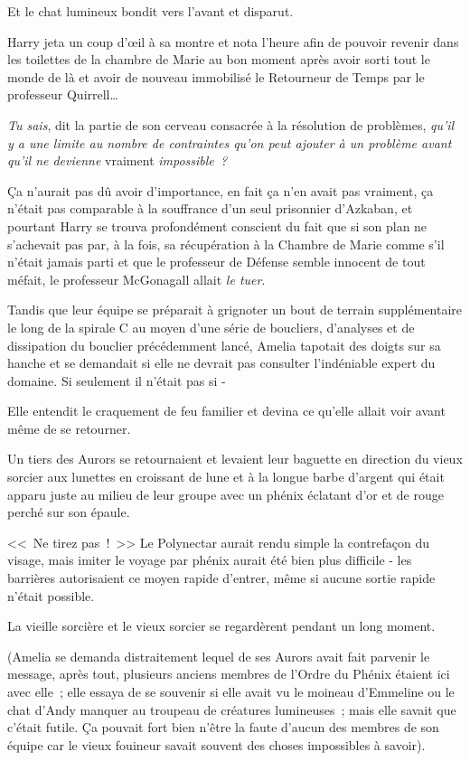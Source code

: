 Et le chat lumineux bondit vers l'avant et disparut.

Harry jeta un coup d'œil à sa montre et nota l'heure afin de pouvoir revenir dans les toilettes de la chambre de Marie au bon moment après avoir sorti tout le monde de là et avoir de nouveau immobilisé le Retourneur de Temps par le professeur Quirrell…

\emph{Tu sais}, dit la partie de son cerveau consacrée à la résolution de problèmes, \emph{qu'il y a une limite au nombre de contraintes qu'on peut ajouter à un problème avant qu'il ne devienne} vraiment \emph{impossible~?}

Ça n'aurait pas dû avoir d'importance, en fait ça n'en avait pas vraiment, ça n'était pas comparable à la souffrance d'un seul prisonnier d'Azkaban, et pourtant Harry se trouva profondément conscient du fait que si son plan ne s'achevait pas par, à la fois, sa récupération à la Chambre de Marie comme s'il n'était jamais parti et que le professeur de Défense semble innocent de tout méfait, le professeur McGonagall allait \emph{le tuer}.

\later

Tandis que leur équipe se préparait à grignoter un bout de terrain supplémentaire le long de la spirale C au moyen d'une série de boucliers, d'analyses et de dissipation du bouclier précédemment lancé, Amelia tapotait des doigts sur sa hanche et se demandait si elle ne devrait pas consulter l'indéniable expert du domaine. Si seulement il n'était pas si -

Elle entendit le craquement de feu familier et devina ce qu'elle allait voir avant même de se retourner.

Un tiers des Aurors se retournaient et levaient leur baguette en direction du vieux sorcier aux lunettes en croissant de lune et à la longue barbe d'argent qui était apparu juste au milieu de leur groupe avec un phénix éclatant d'or et de rouge perché sur son épaule.

<<~Ne tirez pas~!~>> Le Polynectar aurait rendu simple la contrefaçon du visage, mais imiter le voyage par phénix aurait été bien plus difficile - les barrières autorisaient ce moyen rapide d'entrer, même si aucune sortie rapide n'était possible.

La vieille sorcière et le vieux sorcier se regardèrent pendant un long moment.

(Amelia se demanda distraitement lequel de ses Aurors avait fait parvenir le message, après tout, plusieurs anciens membres de l'Ordre du Phénix étaient ici avec elle~; elle essaya de se souvenir si elle avait vu le moineau d'Emmeline ou le chat d'Andy manquer au troupeau de créatures lumineuses~; mais elle savait que c'était futile. Ça pouvait fort bien n'être la faute d'aucun des membres de son équipe car le vieux fouineur savait souvent des choses impossibles à savoir).

